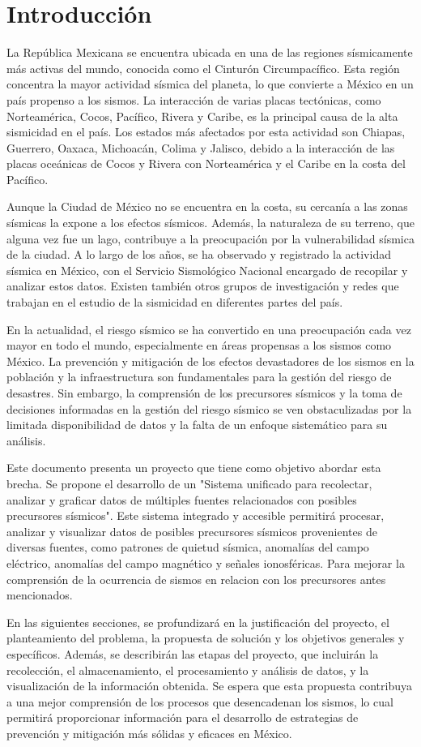 \section{Introducción}
La República Mexicana se encuentra ubicada en una de las regiones sísmicamente más activas del mundo, conocida como el Cinturón Circumpacífico. Esta región concentra la mayor actividad sísmica del planeta, lo que convierte a México en un país propenso a los sismos. La interacción de varias placas tectónicas, como Norteamérica, Cocos, Pacífico, Rivera y Caribe, es la principal causa de la alta sismicidad en el país. Los estados más afectados por esta actividad son Chiapas, Guerrero, Oaxaca, Michoacán, Colima y Jalisco, debido a la interacción de las placas oceánicas de Cocos y Rivera con Norteamérica y el Caribe en la costa del Pacífico\cite{SGM2023}.

Aunque la Ciudad de México no se encuentra en la costa, su cercanía a las zonas sísmicas la expone a los efectos sísmicos. Además, la naturaleza de su terreno, que alguna vez fue un lago, contribuye a la preocupación por la vulnerabilidad sísmica de la ciudad. A lo largo de los años, se ha observado y registrado la actividad sísmica en México, con el Servicio Sismológico Nacional encargado de recopilar y analizar estos datos. Existen también otros grupos de investigación y redes que trabajan en el estudio de la sismicidad en diferentes partes del país.

En la actualidad, el riesgo sísmico se ha convertido en una preocupación cada vez mayor en todo el mundo, especialmente en áreas propensas a los sismos como México. La prevención y mitigación de los efectos devastadores de los sismos en la población y la infraestructura son fundamentales para la gestión del riesgo de desastres. Sin embargo, la comprensión de los precursores sísmicos y la toma de decisiones informadas en la gestión del riesgo sísmico se ven obstaculizadas por la limitada disponibilidad de datos y la falta de un enfoque sistemático para su análisis.

Este documento presenta un proyecto que tiene como objetivo abordar esta brecha. Se propone el desarrollo de un "Sistema unificado para recolectar, analizar y graficar datos de múltiples fuentes relacionados con posibles precursores sísmicos". Este sistema integrado y accesible permitirá procesar, analizar y visualizar datos de posibles precursores sísmicos provenientes de diversas fuentes, como patrones de quietud sísmica, anomalías del campo eléctrico, anomalías del campo magnético y señales ionosféricas. Para mejorar la comprensión de la ocurrencia de sismos en relacion con los precursores antes mencionados. 

En las siguientes secciones, se profundizará en la justificación del proyecto, el planteamiento del problema, la propuesta de solución y los objetivos generales y específicos. Además, se describirán las etapas del proyecto, que incluirán la recolección, el almacenamiento, el procesamiento y análisis de datos, y la visualización de la información obtenida. Se espera que esta propuesta contribuya a una mejor comprensión de los procesos que desencadenan los sismos, lo cual permitirá proporcionar información para  el desarrollo de estrategias de prevención y mitigación más sólidas y eficaces en México.